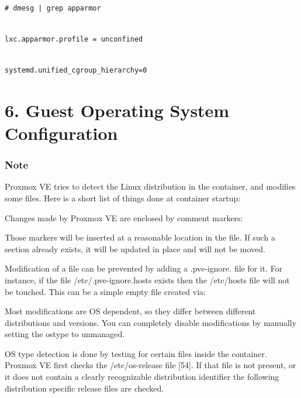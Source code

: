 \begin{lstlisting}

# dmesg | grep apparmor

\end{lstlisting}

\begin{lstlisting}

lxc.apparmor.profile = unconfined

\end{lstlisting}

\begin{lstlisting}

systemd.unified_cgroup_hierarchy=0

\end{lstlisting}


\section{6. Guest Operating System Configuration}

\subsubsection{Note}

Proxmox VE tries to detect the Linux distribution in the container, and modifies some files. Here is a short list of things done at container startup:

Changes made by Proxmox VE are enclosed by comment markers:

Those markers will be inserted at a reasonable location in the file. If such a section already exists, it will be updated in place and will not be moved.

Modification of a file can be prevented by adding a .pve-ignore. file for it. For instance, if the file /etc/.pve-ignore.hosts exists then the /etc/hosts file will not be touched. This can be a simple empty file created via:

Most modifications are OS dependent, so they differ between different distributions and versions. You can completely disable modifications by manually setting the ostype to unmanaged.

OS type detection is done by testing for certain files inside the container. Proxmox VE first checks the /etc/os-release file [54]. If that file is not present, or it does not contain a clearly recognizable distribution identifier the following distribution specific release files are checked.

